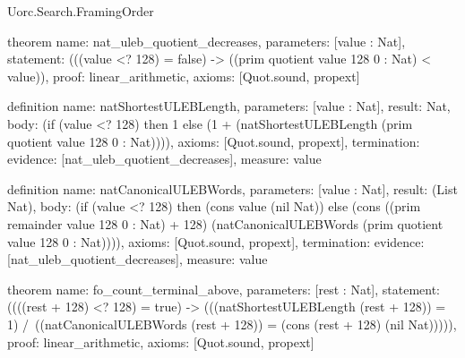 \begin{lexlean}{Uorc.Search.FramingOrder}
\begin{semanticmodule}
theorem{
  name: nat_uleb_quotient_decreases,
  parameters: [value : Nat],
  statement: (((value <? 128) = false) -> ((prim quotient value 128 0 : Nat) < value)),
  proof: linear_arithmetic{},
  axioms: [Quot.sound, propext]
}

definition{
  name: natShortestULEBLength,
  parameters: [value : Nat],
  result: Nat,
  body: (if (value <? 128) then 1 else (1 + (natShortestULEBLength (prim quotient value 128 0 : Nat)))),
  axioms: [Quot.sound, propext],
  termination: {evidence: [nat_uleb_quotient_decreases], measure: value}
}

definition{
  name: natCanonicalULEBWords,
  parameters: [value : Nat],
  result: (List Nat),
  body: (if (value <? 128) then (cons value (nil Nat)) else (cons ((prim remainder value 128 0 : Nat) + 128) (natCanonicalULEBWords (prim quotient value 128 0 : Nat)))),
  axioms: [Quot.sound, propext],
  termination: {evidence: [nat_uleb_quotient_decreases], measure: value}
}

theorem{
  name: fo_count_terminal_above,
  parameters: [rest : Nat],
  statement: ((((rest + 128) <? 128) = true) -> (((natShortestULEBLength (rest + 128)) = 1) /\ ((natCanonicalULEBWords (rest + 128)) = (cons (rest + 128) (nil Nat))))),
  proof: linear_arithmetic{},
  axioms: [Quot.sound, propext]
}


\end{semanticmodule}
\end{lexlean}
